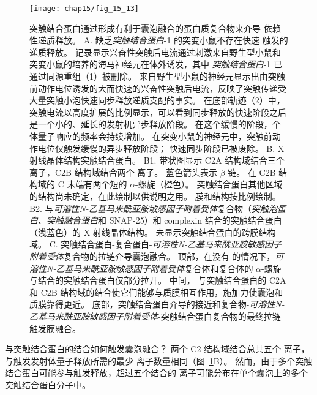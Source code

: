 \begin{figure}[htbp]
	\centering
	\texttt{[image: chap15/fig\_15\_13]}
	\caption{突触结合蛋白通过形成有利于囊泡融合的蛋白质复合物来介导  依赖性递质释放。
		A. 缺乏\textit{突触结合蛋白}-1 的突变小鼠不存在快速  触发的递质释放。
		记录显示兴奋性突触后电流通过刺激来自野生型小鼠和突变小鼠的培养的海马神经元在体外诱发，其中 \textit{突触结合蛋白}-1 已通过同源重组（1）被删除。
		来自野生型小鼠的神经元显示出由突触前动作电位诱发的大而快速的兴奋性突触后电流，反映了突触传递受大量突触小泡快速同步释放递质支配的事实。
		在底部轨迹（2）中，突触电流以高度扩展的比例显示，可以看到同步释放的快速阶段之后是一个小的、延长的发射机异步释放阶段。
		在这个缓慢的阶段，个体量子响应的频率会持续增加。
		在突变小鼠的神经元中，突触前动作电位仅触发缓慢的异步释放阶段；
		快速同步阶段已被废除\cite{geppert1994synaptotagmin}。
		B. X 射线晶体结构突触结合蛋白。
		B1. 带状图显示 C2A 结构域结合三个  离子，C2B 结构域结合两个  离子。
		蓝色箭头表示 $\beta$ 链。
		在 C2B 结构域的 C 末端有两个短的 $\alpha$-螺旋（橙色）。
		突触结合蛋白其他区域的结构尚未确定，在此绘制以供说明之用。
		膜和结构按比例绘制\cite{fernandez2001three}。
		B2. 与\textit{可溶性N-乙基马来酰亚胺敏感因子附着受体}复合物（\textit{突触泡蛋白}、\textit{突触融合蛋白}和 SNAP-25）和 complexin 结合的突触结合蛋白（浅蓝色）的 X 射线晶体结构。
		未显示突触结合蛋白的跨膜结构域\cite{zhou2017primed}。
		C. 突触结合蛋白-复合蛋白-\textit{可溶性N-乙基马来酰亚胺敏感因子附着受体}复合物的拉链介导囊泡融合。
		顶部，在没有  的情况下，\textit{可溶性N-乙基马来酰亚胺敏感因子附着受体}复合体和复合体的 $\alpha$-螺旋与结合的突触结合蛋白仅部分拉开。
		中间， 与突触结合蛋白的 C2A 和 C2B 结构域的结合使它们能够与质膜相互作用，施加力使囊泡和质膜靠得更近。
		底部，突触结合蛋白介导的接近和复合物-\textit{可溶性N-乙基马来酰亚胺敏感因子附着受体}-突触结合蛋白复合物的最终拉链触发膜融合\cite{zhou2017primed}。}
	\label{fig:15_13}
\end{figure}


 与突触结合蛋白的结合如何触发囊泡融合？
两个 C2 结构域结合总共五个  离子，与触发发射体量子释放所需的最少  离子数量相同（图~\ref{fig:15_13}B）。
然而，由于多个突触结合蛋白可能参与触发释放，超过五个结合的  离子可能分布在单个囊泡上的多个突触结合蛋白分子中。


